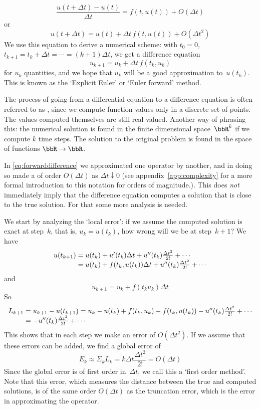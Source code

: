 \[ \frac{u(t+\Delta t)-u(t)}{\Delta t} = f(t,u(t)) +O(\Delta t)\]
or 
\[ u(t+\Delta t) = u(t) + \Delta t\,f(t,u(t)) +O(\Delta t^2) \]
We use this equation to derive a numerical scheme:
with $t_0=0$, $t_{k+1}=t_k+\Delta t=\cdots=(k+1)\Delta t$,
we get a difference equation
\[ u_{k+1}=u_k+\Delta t\,f(t_k,u_k) \]
for $u_k$ quantities, and we hope that $u_k$ will be a good
approximation to~$u(t_k)$.
This is known as the `Explicit Euler' or `Euler forward' method.

The process of going from a differential equation to a difference
equation is often referred to as , since we
compute function values only in a discrete set of points. The values
computed themselves are still real valued. Another way of phrasing
this: the numerical solution is found in the finite dimensional
space~$\bbR^k$ if we compute $k$ time steps. The solution to the original
problem is found in the space of functions $\bbR\rightarrow\bbR$.

In \eqref{eq:forwarddifference} we approximated one operator by
another, and in doing so made a  of order
$O(\Delta t)$ as $\Delta t\downarrow 0$ (see
appendix~\ref{app:complexity} for a more formal introduction to this
notation for orders of magnitude.). This does \emph{not} immediately
imply that the difference equation computes a solution that is close
to the true solution. For that some more analysis is needed.

We start by analyzing the `local error': if we assume the computed
solution is exact at step~$k$, that is, $u_k=u(t_k)$, how wrong will
we be at step~$k+1$? We have
\[
  \begin{array}{r@{{}={}}l}
    u(t_{k+1})&u(t_k)+u'(t_k)\Delta t+u''(t_k)\frac{\Delta t^2}{2!}+\cdots\\
    &u(t_k)+f(t_k,u(t_k))\Delta t+u''(t_k)\frac{\Delta
      t^2}{2!}+\cdots\\
  \end{array}
\]
and
\[
    u_{k+1}=u_k+f(t_ku_k)\Delta t    
\]
  So 
\[
  \begin{array}{r@{{}={}}l}
  L_{k+1}&u_{k+1}-u(t_{k+1})=u_k-u(t_k)+f(t_k,u_k)-f(t_k,u(t_k))
  -u''(t_k)\frac{\Delta t^2}{2!}+\cdots\\
  &-u''(t_k)\frac{\Delta t^2}{2!}+\cdots
  \end{array}
\]
This shows that in each step we make an error of $O(\Delta t^2)$. If
we assume that these errors can be added, we find a global error of
\[ E_k\approx\Sigma_k L_k=k\Delta t\frac{\Delta t^2}{2!}  =O(\Delta t)
\] 
%
Since the global error is of first order in~$\Delta t$, we call
this a `first order method'. Note that this error, which measures the
distance between the true and computed solutions, is of the same order
$O(\Delta t)$
as the truncation error, which is the error in approximating the
operator.

